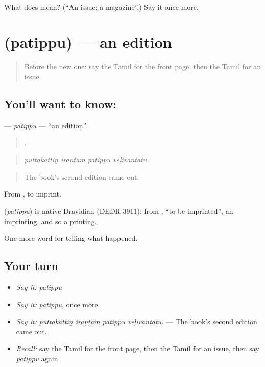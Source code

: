 \begin{tcolorbox}[breakable,colback=teal!4,colframe=teal!35!black,title={Before you move on}]
What does  mean? (\textquotedblleft{}An issue; a magazine\textquotedblright{}.) Say it once more.
\end{tcolorbox}
\section[\texorpdfstring{\ta{பதிப்பு} (patippu)}{பதிப்பு (patippu)}]{ (patippu) — an edition}

\label{lesson:TA-C306-patippu}



\begin{quote}
Before the new one: say the Tamil for the front page, then the Tamil for an issue.
\end{quote}

\subsection*{You'll want to know: }
\textbf{} — \emph{patippu} — \textquotedblleft{}an edition\textquotedblright{}.

\begin{quote}
   .
\end{quote}

\begin{quote}
\emph{puttakattiṉ iraṇṭām patippu veḷivantatu.}
\end{quote}

\begin{quote}
The book's second edition came out.
\end{quote}

From , to imprint.

\begin{cousinweb}
\textbf{} (\emph{patippu}) is native Dravidian (DEDR 3911): from , \textquotedblleft{}to be imprinted\textquotedblright{}, an imprinting, and so a printing.
\end{cousinweb}

\begin{grammarlens}[title={What you've built}]
One more word for telling what happened.
\end{grammarlens}

\subsection*{Your turn}
\begin{itemize}
\raggedright
  \item \emph{Say it:} \emph{patippu}
  \item \emph{Say it:} \emph{patippu}, once more
  \item \emph{Say it:} \emph{puttakattiṉ iraṇṭām patippu veḷivantatu.} — The book's second edition came out.
  \item \emph{Recall:} say the Tamil for the front page, then the Tamil for an issue, then say \emph{patippu} again
\end{itemize}

